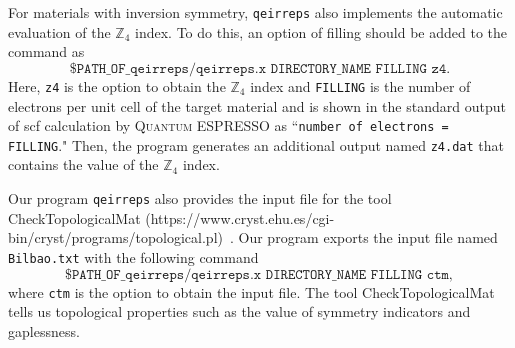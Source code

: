 \documentclass[3p,preprint]{elsarticle}
\newcommand{\mZ}{\mathbb{Z}}
\begin{document}
For materials with inversion symmetry, \texttt{qeirreps} also implements the automatic evaluation of the $\mZ_4$ index. To do this, an option of filling should be added to the command as 
\begin{equation*}
	\texttt{\$ PATH\_OF\_qeirreps/qeirreps.x DIRECTORY\_NAME FILLING z4} .
\end{equation*}
Here, \texttt{z4} is the option to obtain the $\mZ_4$ index and \texttt{FILLING} is the number of electrons per unit cell of the target material and is shown in the standard output of scf calculation by \textsc{Quantum ESPRESSO} as ``\texttt{number of electrons = FILLING}." Then, the program generates an additional output named \texttt{z4.dat} that contains the value of the $\mZ_4$ index.

Our program \texttt{qeirreps} also provides the input file for the tool CheckTopologicalMat (https://www.cryst.ehu.es/cgi-bin/cryst/programs/topological.pl)~\cite{Vergniory2019}. 
Our program exports the input file named \texttt{Bilbao.txt} with the following command
\begin{equation*}
	\texttt{\$ PATH\_OF\_qeirreps/qeirreps.x DIRECTORY\_NAME FILLING ctm} ,
\end{equation*} 
where \texttt{ctm} is the option to obtain the input file. The tool CheckTopologicalMat tells us topological properties such as the value of symmetry indicators and gaplessness.
\end{document}
